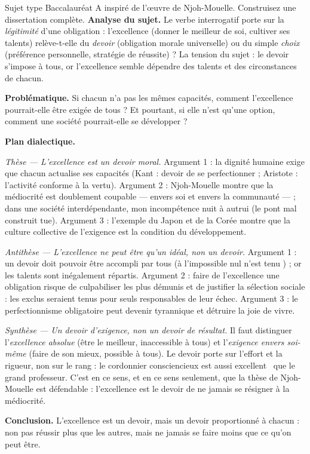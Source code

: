 \documentclass[11pt]{article}
\begin{document}
\begin{exoresolu}
Sujet type Baccalauréat A inspiré de l'œuvre de Njoh-Mouelle. Construisez une dissertation complète.
\tcblower
\textbf{Analyse du sujet.} Le verbe interrogatif porte sur la \emph{légitimité} d'une obligation : l'excellence (donner le meilleur de soi, cultiver ses talents) relève-t-elle du \emph{devoir} (obligation morale universelle) ou du simple \emph{choix} (préférence personnelle, stratégie de réussite) ? La tension du sujet : le devoir s'impose à tous, or l'excellence semble dépendre des talents et des circonstances de chacun.

\textbf{Problématique.} Si chacun n'a pas les mêmes capacités, comment l'excellence pourrait-elle être exigée de tous ? Et pourtant, si elle n'est qu'une option, comment une société pourrait-elle se développer ?

\textbf{Plan dialectique.}

\emph{Thèse — L'excellence est un devoir moral.} Argument 1 : la dignité humaine exige que chacun actualise ses capacités (Kant : devoir de se perfectionner ; Aristote : l'activité conforme à la vertu). Argument 2 : Njoh-Mouelle montre que la médiocrité est doublement coupable — envers soi et envers la communauté — ; dans une société interdépendante, mon incompétence nuit à autrui (le pont mal construit tue). Argument 3 : l'exemple du Japon et de la Corée montre que la culture collective de l'exigence est la condition du développement.

\emph{Antithèse — L'excellence ne peut être qu'un idéal, non un devoir.} Argument 1 : un devoir doit pouvoir être accompli par tous (\guillemotleft à l'impossible nul n'est tenu \guillemotright) ; or les talents sont inégalement répartis. Argument 2 : faire de l'excellence une obligation risque de culpabiliser les plus démunis et de justifier la sélection sociale : les exclus seraient tenus pour seuls responsables de leur échec. Argument 3 : le perfectionnisme obligatoire peut devenir tyrannique et détruire la joie de vivre.

\emph{Synthèse — Un devoir d'exigence, non un devoir de résultat.} Il faut distinguer l'\emph{excellence absolue} (être le meilleur, inaccessible à tous) et l'\emph{exigence envers soi-même} (faire de son mieux, possible à tous). Le devoir porte sur l'effort et la rigueur, non sur le rang : le cordonnier consciencieux est aussi \guillemotleft excellent \guillemotright\ que le grand professeur. C'est en ce sens, et en ce sens seulement, que la thèse de Njoh-Mouelle est défendable : l'excellence est le devoir de ne jamais se résigner à la médiocrité.

\textbf{Conclusion.} L'excellence est un devoir, mais un devoir proportionné à chacun : non pas réussir plus que les autres, mais ne jamais se faire moins que ce qu'on peut être.
\end{exoresolu}
\end{document}
